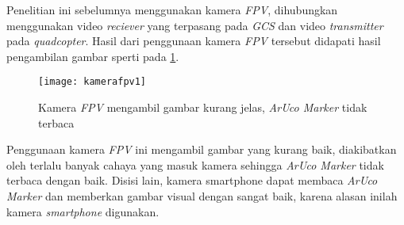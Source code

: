 Penelitian ini sebelumnya menggunakan kamera \textit{FPV}, dihubungkan menggunakan video \textit{reciever} yang terpasang pada \textit{GCS} dan video \textit{transmitter} pada \textit{quadcopter}. Hasil dari penggunaan kamera \textit{FPV} tersebut didapati hasil pengambilan gambar sperti pada \cref{fig:kamerafpv1}.

\begin{figure}[H]
	\centering
	\texttt{[image: kamerafpv1]}
	\caption{Kamera \textit{FPV} mengambil gambar kurang jelas, \textit{ArUco Marker} tidak terbaca}
	\label{fig:kamerafpv1}
\end{figure}

Penggunaan kamera \textit{FPV} ini mengambil gambar yang kurang baik, diakibatkan oleh terlalu banyak cahaya yang masuk kamera sehingga \textit{ArUco Marker} tidak terbaca dengan baik. Disisi lain, kamera smartphone dapat membaca \textit{ArUco Marker} dan memberkan gambar visual dengan sangat baik, karena alasan inilah kamera \textit{smartphone} digunakan.

